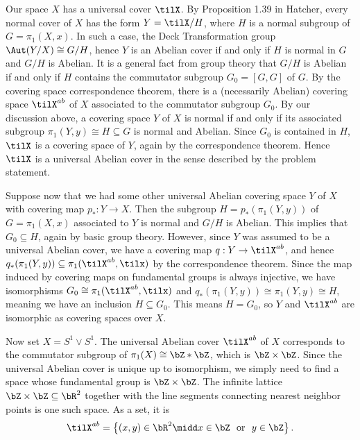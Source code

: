 \begin{homework}[e]
\begin{prf}
    Our space $X$ has a universal cover $\tilX$. By Proposition 1.39 in Hatcher, every normal cover of $X$ has the form $Y = \tilX / H$, where $H$ is a normal subgroup of $G = \pi_1(X,x)$. In such a case, the Deck Transformation group $\Aut(Y/X) \cong G/H$, hence $Y$ is an Abelian cover if and only if $H$ is normal in $G$ and $G/H$ is Abelian. It is a general fact from group theory that $G/H$ is Abelian if and only if $H$ contains the commutator subgroup $G_0 = [G,G]$ of $G$. By the covering space correspondence theorem, there is a (necessarily Abelian) covering space $\tilX^{ab}$ of $X$ associated to the commutator subgroup $G_0$. By our discussion above, a covering space $Y$ of $X$ is normal if and only if its associated subgroup $\pi_1(Y,y) \cong H \subseteq G$ is normal and Abelian. Since $G_0$ is contained in $H$, $\tilX$ is a covering space of $Y$, again by the correspondence theorem. Hence $\tilX$ is a universal Abelian cover in the sense described by the problem statement.

    Suppose now that we had some other universal Abelian covering space $Y$ of $X$ with covering map $p_*:Y\to X$. Then the subgroup $H = p_*(\pi_1(Y,y))$ of $G = \pi_1(X,x)$ associated to $Y$ is normal and $G/H$ is Abelian. This implies that $G_0 \subseteq H$, again by basic group theory. However, since $Y$ was assumed to be a universal Abelian cover, we have a covering map $q:Y \to \tilX^{ab}$, and hence $q_*(\pi_1(Y,y))\subseteq \pi_1(\tilX^{ab},\tilx)$ by the correspondence theorem. Since the map induced by covering maps on fundamental groups is always injective, we have isomorphisms $G_0 \cong \pi_1(\tilX^{ab},\tilx)$ and $q_*(\pi_1(Y,y))\cong \pi_1(Y,y) \cong H$, meaning we have an inclusion $H \subseteq G_0$. This means $H = G_0$, so $Y$ and $\tilX^{ab}$ are isomorphic as covering spaces over $X$.

    \bigskip

    Now set $X = S^1\vee S^1$. The universal Abelian cover $\tilX^{ab}$ of $X$ corresponds to the commutator subgroup of $\pi_1(X) \cong \bZ\ast \bZ$, which is $\bZ\times \bZ$. Since the universal Abelian cover is unique up to isomorphism, we simply need to find a space whose fundamental group is $\bZ\times \bZ$. The infinite lattice $\bZ\times \bZ \subseteq \bR^2$ together with the line segments connecting nearest neighbor points is one such space. As a set, it is
    \begin{align*}
      \tilX^{ab} = \left\{(x,y) \in \bR^2 \midd x \in \bZ ~\text{ or }~ y\in \bZ\right\}.
    \end{align*}


\end{prf}
\end{homework}

